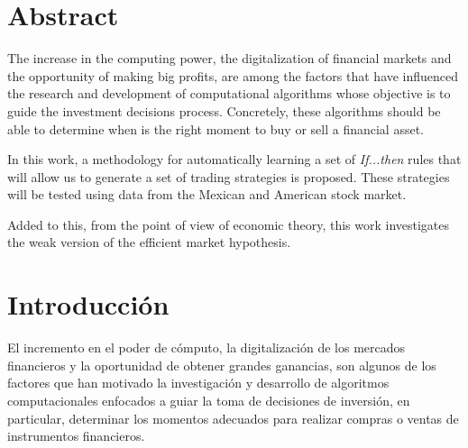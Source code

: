 \documentclass[12pt]{report}
\theoremstyle{break}
\theoremstyle{break}
\begin{document}
\chapter*{Abstract}
The increase in the computing power, the digitalization of financial markets and the opportunity of making big profits, are among the factors that have influenced the research and development of computational algorithms whose objective is to guide the investment decisions process. Concretely, these algorithms should be able to determine when is the right moment to buy or sell a financial asset.

In this work, a methodology for automatically learning a set of \textit{If...then} rules that will allow us to generate a set of trading strategies is proposed. These strategies will be tested using data from the Mexican and American stock market.

Added to this, from the point of view of economic theory, this work investigates the weak version of the efficient market hypothesis.



\chapter[Capítulo \thechapter: Introducción]{Introducción}
\label{capitulo:introduccion}
El incremento en el poder de cómputo, la digitalización de los mercados financieros y la oportunidad de obtener grandes ganancias, son algunos de los factores que han motivado la investigación y desarrollo de algoritmos computacionales enfocados a guiar la toma de decisiones de inversión, en particular, determinar los momentos adecuados para realizar compras o ventas de instrumentos financieros.
\end{document}
